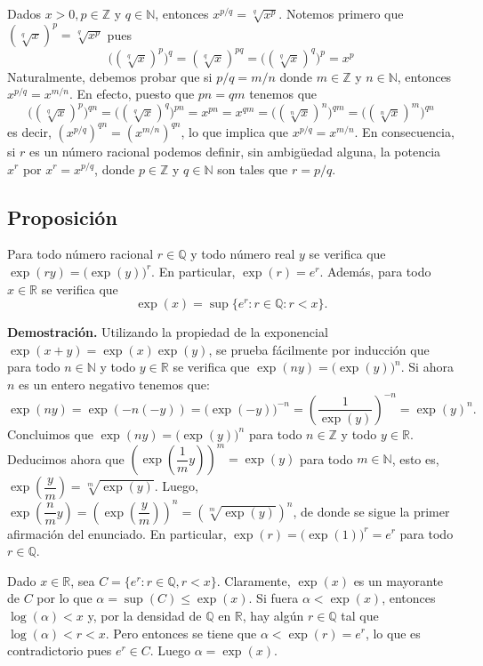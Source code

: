 \documentclass[10pt,a4paper]{article}
\begin{document}
	Dados $x > 0, p \in \mathbb{Z}$ y $q \in \mathbb{N}$, entonces $x^{p/q} = \sqrt[q]{x^p}$. Notemos primero que $(\sqrt[q]{x})^p = \sqrt[q]{x^p}$ pues $$
	\big((\sqrt[q]{x})^p\big)^q = (\sqrt[q]{x})^{pq} = \big((\sqrt[q]{x})^q\big)^p = x^p$$
	Naturalmente, debemos probar que si $p/q = m/n$ donde $m \in \mathbb{Z}$ y $n \in \mathbb{N}$, entonces $x^{p/q} = x^{m/n}$. En efecto, puesto que $pn = qm$ tenemos que 
	$$\big((\sqrt[q]{x})^p\big)^{qn} = \big((\sqrt[q]{x})^q\big)^{pn} = x^{pn} = x^{qm} = \big((\sqrt[n]{x})^n\big)^{qm} = \big((\sqrt[n]{x})^m\big)^{qn}$$ 
	es decir, $\left(x^{p/q}\right) ^{qn} = \left(x^{m/n}\right) ^{qn}$, lo que implica que $x^{p/q} = x^{m/n}$. En consecuencia, si $r$ es un número racional podemos definir, sin ambigüedad alguna, la potencia $x^r$ por $x^r = x^{p/q}$, donde $p \in \mathbb{Z}$ y $q \in \mathbb{N}$ son tales que $r = p/q$.
	
	\subsection{Proposición}
	Para todo número racional $r \in \mathbb{Q}$ y todo número real $y$ se verifica que $\exp(ry) = \big(\exp(y)\big)^r$. En particular, $\exp(r) = e^r$. Además, para todo $x \in \mathbb{R}$ se verifica que $$\exp(x) = \sup\{e^r:r \in \mathbb{Q}: r < x\}.$$
	
	\textbf{Demostración. }Utilizando la propiedad de la exponencial $\exp(x+y) = \exp(x)\exp(y)$, se prueba
	fácilmente por inducción que para todo $n \in \mathbb{N}$ y todo $y \in \mathbb{R}$ se verifica que $\exp(ny) = \big(\exp(y)\big)^n$. Si ahora $n$ es un entero negativo tenemos que:
	$$\exp(ny) = \exp(-n(-y)) = \big(\exp(-y)\big)^{-n} = \left(\dfrac{1}{\exp(y)}\right) ^{-n} = \exp(y)^n.$$
	Concluimos que $\exp(ny) = \big(\exp(y)\big)^n$ para todo $n \in \mathbb{Z}$ y todo $y \in \mathbb{R}$. Deducimos ahora que $\left(\exp\left(\dfrac{1}{m}y\right)\right)^m = \exp(y)$ para todo $m \in \mathbb{N}$, esto es, $\exp\left(\dfrac{y}{m}\right) = \sqrt[m]{\exp(y)}$. Luego, $\exp\left(\dfrac{n}{m}y\right) = \left(\exp\left(\dfrac{y}{m}\right)\right)^n = \left(\sqrt[m]{\exp(y)}\right)^n$, de donde se sigue la primer afirmación del enunciado. En particular, $\exp(r) = \big(\exp(1)\big)^r = e^r$ para todo $r \in \mathbb{Q}$.
	
	Dado $x \in \mathbb{R}$, sea $C = \{e^r:r \in \mathbb{Q}, r < x\}$. Claramente,  $\exp(x)$ es un mayorante de $C$ por lo que $\alpha = \sup(C) \leq \exp(x)$. Si fuera $\alpha < \exp(x)$, entonces $\log(\alpha) < x$ y, por la densidad de $\mathbb{Q}$ en $\mathbb{R}$, hay algún $r \in \mathbb{Q}$ tal que $\log(\alpha) < r < x$. Pero entonces se tiene que $\alpha < \exp(r) = e^r$, lo que es contradictorio pues $e^r \in C$. Luego $\alpha = \exp(x)$.
\end{document}
